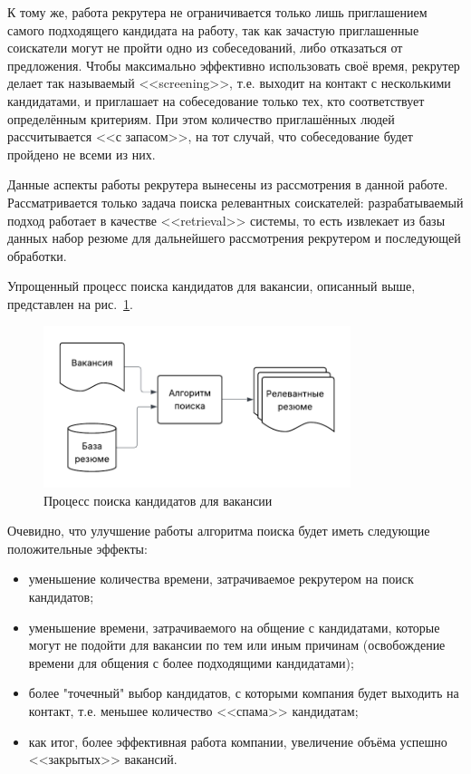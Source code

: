 \documentclass[14pt]{mmcs_article}
\begin{document}
К тому же, работа рекрутера не ограничивается только лишь приглашением самого подходящего кандидата на работу, так как зачастую приглашенные соискатели могут не пройти одно из собеседований, либо отказаться от предложения. Чтобы максимально эффективно использовать своё время, рекрутер делает так называемый <<screening>>, т.е. выходит на контакт с несколькими кандидатами, и приглашает на собеседование только тех, кто соответствует определённым критериям. При этом количество приглашённых людей рассчитывается <<с запасом>>, на тот случай, что собеседование будет пройдено не всеми из них.

Данные аспекты работы рекрутера вынесены из рассмотрения в данной работе. Рассматривается только задача поиска релевантных соискателей: разрабатываемый подход работает в качестве <<retrieval>> системы, то есть извлекает из базы данных набор резюме для дальнейшего рассмотрения рекрутером и последующей обработки.

Упрощенный процесс поиска кандидатов для вакансии, описанный выше, представлен на рис.~\ref{fig:candidate_search_process}.

\begin{figure}[h]
  \centering
  \includegraphics[width=0.8\textwidth]{plots/candidate_search_process.pdf}
  \caption{Процесс поиска кандидатов для вакансии}
  \label{fig:candidate_search_process}
\end{figure}

Очевидно, что улучшение работы алгоритма поиска будет иметь следующие положительные эффекты:

\begin{itemize}
  \item уменьшение количества времени, затрачиваемое рекрутером на поиск кандидатов;
  \item уменьшение времени, затрачиваемого на общение с кандидатами, которые могут не подойти для вакансии по тем или иным причинам
        (освобождение времени для общения с более подходящими кандидатами);
  \item более "точечный" выбор кандидатов, с которыми компания будет выходить на контакт, т.е. меньшее количество <<спама>> кандидатам;
  \item как итог, более эффективная работа компании, увеличение объёма успешно <<закрытых>> вакансий.
\end{itemize}
\end{document}
